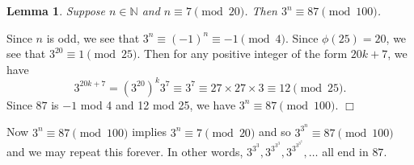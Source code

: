 \documentclass{article}
\def\N{{\mathbb N}}
\newtheorem{lemma}[subsection]{Lemma}
\newenvironment{proof}{\noindent {\bf Proof:}}{$\Box$ \vspace{2 ex}}
\begin{document}
\begin{lemma}
    Suppose $n\in\N$ and $n\equiv 7\pmod{20}$. Then $3^n\equiv 87\pmod{100}$.
\end{lemma}

\begin{proof}
    Since $n$ is odd, we see that $3^n\equiv (-1)^n \equiv -1\pmod{4}$. Since $\phi(25) = 20$, we see that $3^{20}\equiv 1\pmod{25}$. Then for any positive integer of the form $20k+7$, we have
    $$3^{20k+7} = (3^{20})^k3^7\equiv 3^7 \equiv 27 \times 27 \times 3 \equiv 12\pmod{25}.$$
    Since $87$ is $-1$ mod 4 and 12 mod 25, we have $3^n\equiv 87\pmod{100}$.
\end{proof}

Now $3^n\equiv 87\pmod{100}$ implies $3^n\equiv 7\pmod{20}$ and so $3^{3^n}\equiv 87\pmod{100}$ and we may repeat this forever. In other words, $3^{3^3}, 3^{3^{3^3}}, 3^{3^{3^{3^3}}},\ldots$ all end in $87$.
\end{document}
